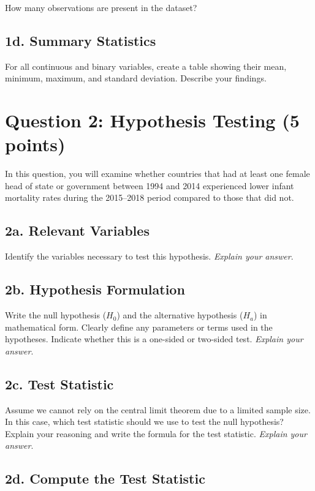 \documentclass[a4paper, 11pt]{article}
\begin{document}
How many observations are present in the dataset?


\subsection*{1d. Summary Statistics}

For all continuous and binary variables, create a table showing their mean, minimum, maximum, and standard deviation. Describe your findings.


\section*{Question 2: Hypothesis Testing (5 points)}

In this question, you will examine whether countries that had at least one female head of state or government between 1994 and 2014 experienced lower infant mortality rates during the 2015–2018 period compared to those that did not.

\subsection*{2a. Relevant Variables}

Identify the variables necessary to test this hypothesis. \textit{Explain your answer}.

\subsection*{2b. Hypothesis Formulation}

Write the null hypothesis ($H_0$) and the alternative hypothesis ($H_a$) in mathematical form. Clearly define any parameters or terms used in the hypotheses. Indicate whether this is a one-sided or two-sided test. \textit{Explain your answer}.

\subsection*{2c. Test Statistic}

Assume we cannot rely on the central limit theorem due to a limited sample size. In this case, which test statistic should we use to test the null hypothesis? Explain your reasoning and write the formula for the test statistic. \textit{Explain your answer}.

\subsection*{2d. Compute the Test Statistic}
\end{document}
